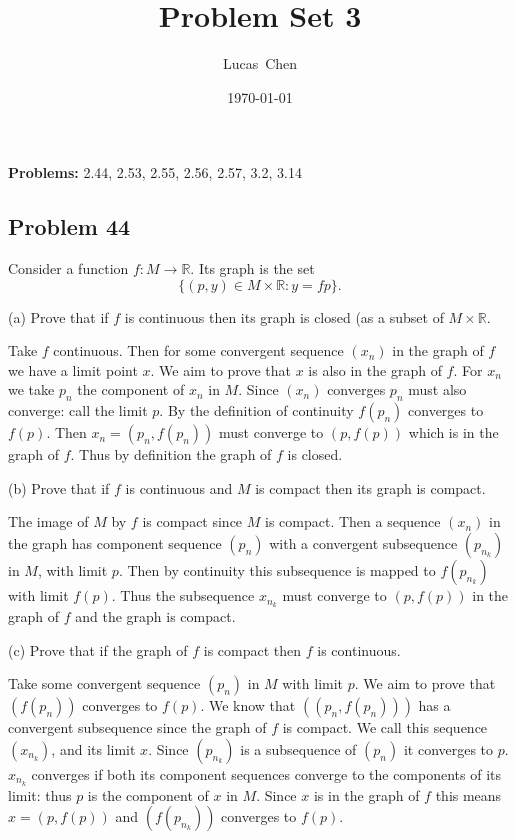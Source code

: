 \documentclass{amsart}
\title{Problem Set 3}
\author{Lucas\ Chen}
\date{\today}
\begin{document}
\maketitle

\textbf{Problems:} 2.44, 2.53, 2.55, 2.56, 2.57, 3.2, 3.14

\subsection*{Problem 44} Consider a function $f: M\rightarrow\mathbb{R}$. Its graph is the set $$\{(p,y)\in M\times\mathbb{R}:y=fp\}.$$

(a) Prove that if $f$ is continuous then its graph is closed (as a subset of $M\times\mathbb{R}$.

\medskip

\noindent Take $f$ continuous. Then for some convergent sequence $(x_n)$ in the graph of $f$ we have a limit point $x$. We aim
to prove that $x$ is also in the graph of $f$. For $x_n$ we take $p_n$ the component of $x_n$ in $M$. Since $(x_n)$ converges 
$p_n$ must also converge: call the limit $p$. By the definition of continuity $f(p_n)$ converges to $f(p)$. 
Then $x_n=(p_n, f(p_n))$ must converge to $(p, f(p))$ which is in the graph of $f$. Thus by definition the graph of $f$ is closed.

\medskip

(b) Prove that if $f$ is continuous and $M$ is compact then its graph is compact. 

\medskip

\noindent The image of $M$ by $f$ is compact since $M$ is compact. Then a sequence $(x_n)$ in the graph has component sequence $(p_n)$
with a convergent subsequence $(p_{n_k})$ in $M$, with limit $p$. Then by continuity this subsequence is mapped to $f(p_{n_k})$ with 
limit $f(p)$. Thus the subsequence $x_{n_k}$ must converge to $(p, f(p))$ in the graph of $f$ and the graph is compact.

\medskip

(c) Prove that if the graph of $f$ is compact then $f$ is continuous.

\medskip

\noindent Take some convergent sequence $(p_n)$ in $M$ with limit $p$. We aim to prove that $(f(p_n))$ converges to $f(p)$. 
We know that $((p_n, f(p_n)))$ has a convergent subsequence since the graph of $f$ is compact. We call this sequence $(x_{n_k})$, and its limit $x$.  
Since $(p_{n_k})$ is a subsequence of $(p_n)$ it converges to $p$. $x_{n_k}$ converges if both its component sequences converge to the components of 
its limit: thus $p$ is the component of $x$ in $M$. Since $x$ is in the graph of $f$ this means $x=(p, f(p))$ and $(f(p_{n_k}))$ converges to
$f(p)$. 
\end{document}
